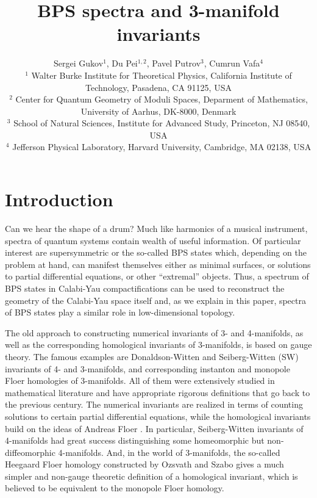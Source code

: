 \documentclass[hyper,letterpaper]{JHEP3}
\title{BPS spectra and 3-manifold invariants}
\author{Sergei Gukov$^{1}$, Du Pei$^{1,2}$, Pavel Putrov$^{3}$, Cumrun Vafa$^{4}$
\\
$^1$ Walter Burke Institute for Theoretical Physics, California Institute of Technology, Pasadena, CA 91125, USA \\
$^2$ Center for Quantum Geometry of Moduli Spaces, Deparment of Mathematics, University
of Aarhus, DK-8000, Denmark\\
$^3$ School of Natural Sciences, Institute for Advanced Study, Princeton, NJ 08540, USA \\
$^4$ Jefferson Physical Laboratory, Harvard University, Cambridge, MA 02138, USA}
\begin{document}
\section{Introduction}

Can we hear the shape of a drum?
Much like harmonics of a musical instrument, spectra of quantum systems contain wealth of useful information.
Of particular interest are supersymmetric or the so-called BPS states which, depending on the problem at hand,
can manifest themselves either as minimal surfaces, or solutions to partial differential equations, or other ``extremal'' objects.
Thus, a spectrum of BPS states in Calabi-Yau compactifications can be used to reconstruct the geometry
of the Calabi-Yau space itself and, as we explain in this paper, spectra of BPS states play a similar role in low-dimensional topology.

The old approach to constructing numerical invariants of 3- and 4-manifolds, as well as the corresponding homological invariants of 3-manifolds,
is based on gauge theory.
The famous examples are Donaldson-Witten and Seiberg-Witten (SW) invariants of 4- and 3-manifolds,
and corresponding instanton and monopole \cite{kronheimer2007monopoles} Floer homologies of 3-manifolds.
All of them were extensively studied in mathematical literature and have appropriate rigorous definitions that go back to the previous century.
The numerical invariants are realized in terms of counting solutions to certain partial differential equations,
while the homological invariants build on the ideas of Andreas Floer \cite{MR956166}.
In particular, Seiberg-Witten invariants of 4-manifolds had great success distinguishing some
homeomorphic but non-diffeomorphic 4-manifolds.
And, in the world of 3-manifolds, the so-called Heegaard Floer homology constructed
by Ozsvath and Szabo \cite{ozsvath2004holomorphic} gives a much simpler and non-gauge theoretic definition
of a homological invariant, which is believed to be equivalent to the monopole Floer homology.
\end{document}
